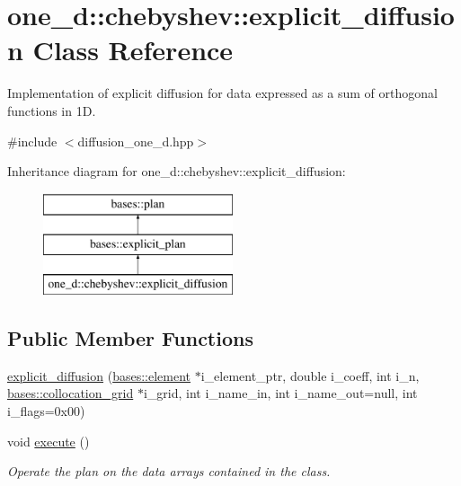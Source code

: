 \hypertarget{classone__d_1_1chebyshev_1_1explicit__diffusion}{\section{one\-\_\-d\-:\-:chebyshev\-:\-:explicit\-\_\-diffusion Class Reference}
\label{classone__d_1_1chebyshev_1_1explicit__diffusion}
}


Implementation of explicit diffusion for data expressed as a sum of orthogonal functions in 1\-D.  




{\ttfamily \#include $<$diffusion\-\_\-one\-\_\-d.\-hpp$>$}

Inheritance diagram for one\-\_\-d\-:\-:chebyshev\-:\-:explicit\-\_\-diffusion\-:\begin{figure}[H]
\begin{center}
\leavevmode
\includegraphics[height=3.000000cm]{classone__d_1_1chebyshev_1_1explicit__diffusion}
\end{center}
\end{figure}
\subsection*{Public Member Functions}
\begin{DoxyCompactItemize}
\item 
\hyperlink{classone__d_1_1chebyshev_1_1explicit__diffusion_a5b7347acb85ad5fcb1c76adb10dc20fa}{explicit\-\_\-diffusion} (\hyperlink{classbases_1_1element}{bases\-::element} $\ast$i\-\_\-element\-\_\-ptr, double i\-\_\-coeff, int i\-\_\-n, \hyperlink{classbases_1_1collocation__grid}{bases\-::collocation\-\_\-grid} $\ast$i\-\_\-grid, int i\-\_\-name\-\_\-in, int i\-\_\-name\-\_\-out=null, int i\-\_\-flags=0x00)
\begin{DoxyCompactList}\small\item\em \end{DoxyCompactList}\item 
void \hyperlink{classone__d_1_1chebyshev_1_1explicit__diffusion_a2a6de638d550ecd781c74d7ef35dd866}{execute} ()
\begin{DoxyCompactList}\small\item\em Operate the plan on the data arrays contained in the class. \end{DoxyCompactList}\end{DoxyCompactItemize}

